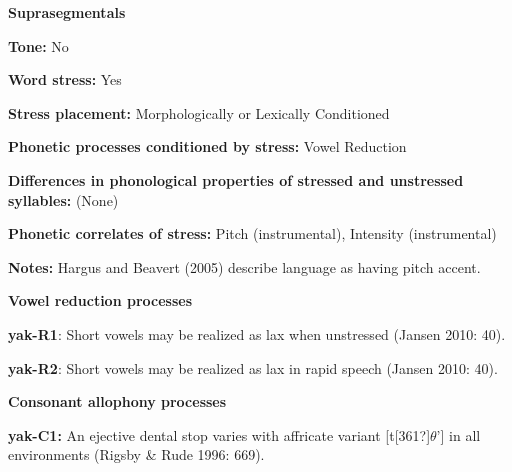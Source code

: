 \begin{styleBody}
\textbf{Suprasegmentals}
\end{styleBody}

\begin{styleBody}
\textbf{Tone:} No
\end{styleBody}

\begin{styleBody}
\textbf{Word stress:} Yes
\end{styleBody}

\begin{styleBody}
\textbf{Stress placement:} Morphologically or Lexically Conditioned
\end{styleBody}

\begin{styleBody}
\textbf{Phonetic processes conditioned by stress:} Vowel Reduction
\end{styleBody}

\begin{styleBody}
\textbf{Differences in phonological properties of stressed and unstressed syllables:} (None)
\end{styleBody}

\begin{styleBody}
\textbf{Phonetic correlates of stress: }Pitch (instrumental), Intensity (instrumental)
\end{styleBody}

\begin{styleBody}
\textbf{Notes: }Hargus and Beavert (2005) describe language as having pitch accent.
\end{styleBody}

\begin{styleBody}
\textbf{Vowel reduction processes}
\end{styleBody}

\begin{styleBody}
\textbf{yak-R1}: Short vowels may be realized as lax when unstressed (Jansen 2010: 40).
\end{styleBody}

\begin{styleBody}
\textbf{yak-R2}: Short vowels may be realized as lax in rapid speech (Jansen 2010: 40).
\end{styleBody}

\begin{styleBody}
\textbf{Consonant allophony processes}
\end{styleBody}

\begin{styleBody}
\textbf{yak-C1: }An ejective dental stop varies with affricate variant [t[361?]$\theta $’] in all environments (Rigsby \& Rude 1996: 669).
\end{styleBody}

